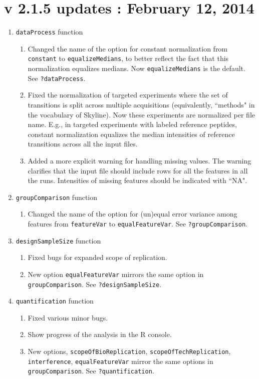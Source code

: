 \documentclass[10pt]{article}
\begin{document}
\section*{v 2.1.5 updates : February 12, 2014}

\begin{enumerate}

\item {\tt dataProcess} function 
	\begin{enumerate}
	\item Changed the name of the option for constant normalization from {\tt constant} to {\tt equalizeMedians}, to better reflect the fact that this normalization equalizes medians. Now {\tt equalizeMedians} is the default. See {\tt ?dataProcess}.
	\item Fixed the normalization of targeted experiments where the set of transitions is split across multiple acquisitions (equivalently, ``methods" in the vocabulary of Skyline). Now these experiments are normalized per file name. E.g., in targeted experiments with labeled reference peptides, constant normalization equalizes the median intensities of reference transitions across all the input files.
	\item Added a more explicit warning for handling missing values. The warning clarifies that the input file should include rows for all the features in all the runs. Intensities of missing features should be indicated with ``NA".
	\end{enumerate}
	
\item {\tt groupComparison} function 
	\begin{enumerate}
	\item Changed the name of the option for (un)equal error variance among features from {\tt featureVar} to {\tt equalFeatureVar}. See {\tt ?groupComparison}.
	\end{enumerate}
	
\item {\tt designSampleSize} function 
	\begin{enumerate}
	\item Fixed bugs for expanded scope of replication.
	\item New option {\tt equalFeatureVar} mirrors the same option in {\tt groupComparison}. See {\tt ?designSampleSize}.
	\end{enumerate}
	
\item {\tt quantification} function 
	\begin{enumerate}
	\item Fixed various minor bugs.
	\item Show progress of the analysis in the R console.
	\item New options, {\tt scopeOfBioReplication}, {\tt scopeOfTechReplication}, {\tt interference}, {\tt equalFeatureVar} mirror the same options in {\tt groupComparison}. See {\tt ?quantification}.
	\end{enumerate}
	

\end{enumerate}
\end{document}
